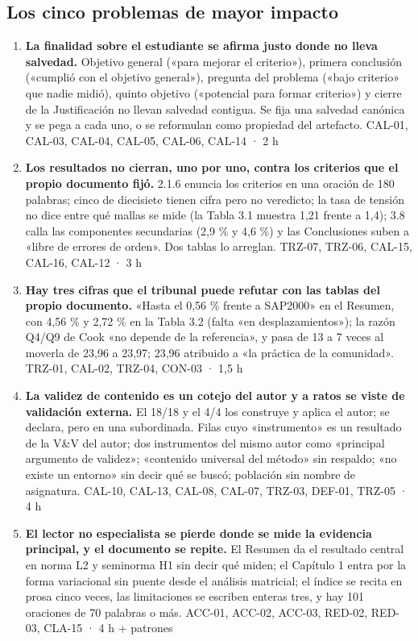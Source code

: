 \subsection*{Los cinco problemas de mayor impacto}
\begin{enumerate}[leftmargin=1.5em,itemsep=5pt]
\item \textbf{La finalidad sobre el estudiante se afirma justo donde no lleva salvedad.} Objetivo general («para mejorar el criterio»), primera conclusión («cumplió con el objetivo general»), pregunta del problema («bajo criterio» que nadie midió), quinto objetivo («potencial para formar criterio») y cierre de la Justificación no llevan salvedad contigua. Se fija una salvedad canónica y se pega a cada uno, o se reformulan como propiedad del artefacto. {\small\color{gris}\sffamily CAL-01, CAL-03, CAL-04, CAL-05, CAL-06, CAL-14 · 2 h}
\item \textbf{Los resultados no cierran, uno por uno, contra los criterios que el propio documento fijó.} 2.1.6 enuncia los criterios en una oración de 180 palabras; cinco de diecisiete tienen cifra pero no veredicto; la tasa de tensión no dice entre qué mallas se mide (la Tabla 3.1 muestra 1,21 frente a 1,4); 3.8 calla las componentes secundarias (2,9 \% y 4,6 \%) y las Conclusiones suben a «libre de errores de orden». Dos tablas lo arreglan. {\small\color{gris}\sffamily TRZ-07, TRZ-06, CAL-15, CAL-16, CAL-12 · 3 h}
\item \textbf{Hay tres cifras que el tribunal puede refutar con las tablas del propio documento.} «Hasta el 0,56 \% frente a SAP2000» en el Resumen, con 4,56 \% y 2,72 \% en la Tabla 3.2 (falta «en desplazamientos»); la razón Q4/\allowbreak{}Q9 de Cook «no depende de la referencia», y pasa de 13 a 7 veces al moverla de 23,96 a 23,97; 23,96 atribuido a «la práctica de la comunidad». {\small\color{gris}\sffamily TRZ-01, CAL-02, TRZ-04, CON-03 · 1,5 h}
\item \textbf{La validez de contenido es un cotejo del autor y a ratos se viste de validación externa.} El 18/\allowbreak{}18 y el 4/\allowbreak{}4 los construye y aplica el autor; se declara, pero en una subordinada. Filas cuyo «instrumento» es un resultado de la V\&V del autor; dos instrumentos del mismo autor como «principal argumento de validez»; «contenido universal del método» sin respaldo; «no existe un entorno» sin decir qué se buscó; población sin nombre de asignatura. {\small\color{gris}\sffamily CAL-10, CAL-13, CAL-08, CAL-07, TRZ-03, DEF-01, TRZ-05 · 4 h}
\item \textbf{El lector no especialista se pierde donde se mide la evidencia principal, y el documento se repite.} El Resumen da el resultado central en norma L2 y seminorma H1 sin decir qué miden; el Capítulo 1 entra por la forma variacional sin puente desde el análisis matricial; el índice se recita en prosa cinco veces, las limitaciones se escriben enteras tres, y hay 101 oraciones de 70 palabras o más. {\small\color{gris}\sffamily ACC-01, ACC-02, ACC-03, RED-02, RED-03, CLA-15 · 4 h + patrones}
\end{enumerate}
